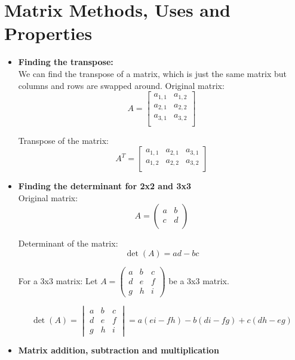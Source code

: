 \documentclass[a4paper,12pt]{article}
\begin{document}
\section{Matrix Methods, Uses and Properties}

\begin{itemize}[leftmargin=*]
    \item \textbf{Finding the transpose:}\\
    We can find the transpose of a matrix, which is just the same matrix but columns and rows are swapped around.
    Original matrix:
    \[
    A =
    \begin{bmatrix}
    a_{1,1} & a_{1,2} \\
    a_{2,1} & a_{2,2} \\
    a_{3,1} & a_{3,2} \\
    \end{bmatrix}   
    \]

    Transpose of the matrix:    
    \[
    A^T =
    \begin{bmatrix}
    a_{1,1} & a_{2,1} & a_{3,1} \\
    a_{1,2} & a_{2,2} & a_{3,2} \\
    \end{bmatrix}
    \]
    \item \textbf{Finding the determinant for 2x2 and 3x3}\\ 
    Original matrix:
    \[
    A =
    \begin{pmatrix}
    a & b \\
    c & d \\
    \end{pmatrix}
    \]

    Determinant of the matrix:
    \[
    \det(A) = ad - bc
    \]

    For a 3x3 matrix:
    Let $A = \begin{pmatrix} a & b & c \\ d & e & f \\ g & h & i \end{pmatrix}$ be a 3x3 matrix.

    \[
    \det(A) = 
    \begin{vmatrix} 
    a & b & c \\ 
    d & e & f \\ 
    g & h & i 
    \end{vmatrix} 
    = a(ei - fh) - b(di - fg) + c(dh - eg)
\]
    \item \textbf{Matrix addition, subtraction and multiplication}
    

\end{itemize}
\end{document}
